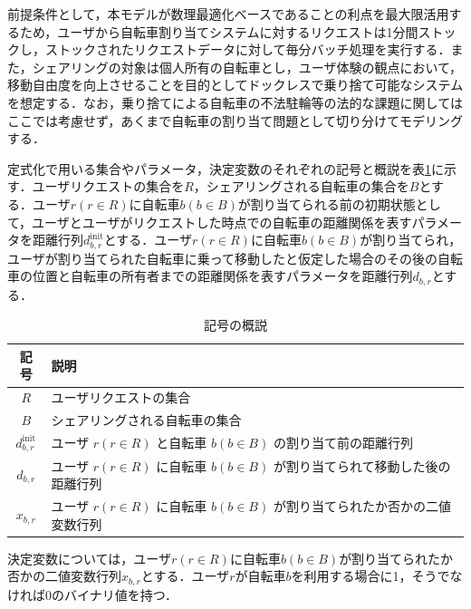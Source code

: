       \par 前提条件として，本モデルが数理最適化ベースであることの利点を最大限活用するため，ユーザから自転車割り当てシステムに対するリクエストは1分間ストックし，ストックされたリクエストデータに対して毎分バッチ処理を実行する．また，シェアリングの対象は個人所有の自転車とし，ユーザ体験の観点において，移動自由度を向上させることを目的としてドックレスで乗り捨て可能なシステムを想定する．なお，乗り捨てによる自転車の不法駐輪等の法的な課題に関してはここでは考慮せず，あくまで自転車の割り当て問題として切り分けてモデリングする．
          
      \par 定式化で用いる集合やパラメータ，決定変数のそれぞれの記号と概説を表\ref{tab:記号の概説}に示す．ユーザリクエストの集合を$R$，シェアリングされる自転車の集合を$B$とする．ユーザ$r (r \in R)$に自転車$b (b \in B)$が割り当てられる前の初期状態として，ユーザとユーザがリクエストした時点での自転車の距離関係を表すパラメータを距離行列$d^{\text{init}}_{b,r}$とする．ユーザ$r (r \in R)$に自転車$b (b \in B)$が割り当てられ，ユーザが割り当てられた自転車に乗って移動したと仮定した場合のその後の自転車の位置と自転車の所有者までの距離関係を表すパラメータを距離行列$d_{b,r}$とする．
          
      \begin{table}[htbp]
        \caption{記号の概説}
        \label{tab:記号の概説}
        \centering
        \begin{tabular}{c p{6cm}}
          \hline 
          記号 & 説明 \\
          \hline
          $R$ & ユーザリクエストの集合 \\
          $B$ & シェアリングされる自転車の集合 \\
          $d^{\text{init}}_{b,r}$ & ユーザ $r(r \in R)$ と自転車 $b(b \in B)$ の割り当て前の距離行列\\
          $d_{b,r}$ & ユーザ $r (r \in R)$ に自転車 $b (b \in B)$ が割り当てられて移動した後の距離行列 \\
          $x_{b,r}$ & ユーザ $r (r \in R)$ に自転車 $b (b \in B)$ が割り当てられたか否かの二値変数行列 \\
          \hline
        \end{tabular}
      \end{table}
      
      \par 決定変数については，ユーザ$r (r \in R)$に自転車$b (b \in B)$が割り当てられたか否かの二値変数行列$x_{b,r}$とする．ユーザ$r$が自転車$b$を利用する場合に1，そうでなければ0のバイナリ値を持つ．
      
